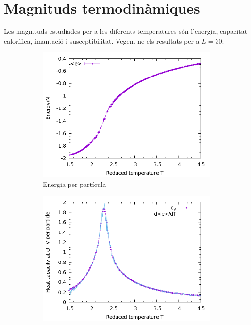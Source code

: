 \documentclass[a4paper]{article}
\begin{document}
\section{Magnituds termodinàmiques}

Les magnituds estudiades per a les diferents temperatures són l'energia, capacitat calorífica, imantació i susceptibilitat. Vegem-ne els resultats per a $L=30$:

\begin{figure}[H]
    \centering
    \begin{subfigure}{.45\textwidth}
        \centering
        \includegraphics[width=\textwidth]{props-L-030_e.png}
        \caption{Energia per partícula}
        \label{fig:props-e}
    \end{subfigure}
    \begin{subfigure}{.45\textwidth}
        \centering
        \includegraphics[width=\textwidth]{props-L-030_cvn.png}

\end{subfigure}
\end{figure}
\end{document}
